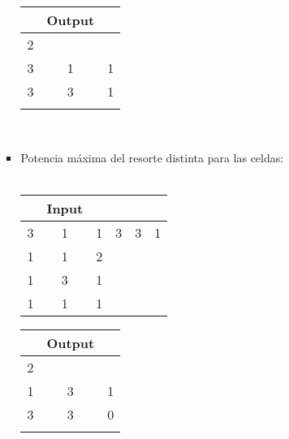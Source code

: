 \documentclass[11pt, a4paper, twoside]{article}
\begin{document}
\begin{itemize}
\begin{itemize}
\begin{itemize}
\begin{minipage}{0.3\textwidth}
\begin{tabular}{ccc}
								   & Output \\
								   \hline
								   2 &   &   \\
								   3 & 1 & 1 \\
								   3 & 3 & 1 \\
								   \\
							\end{tabular}
					    \end{minipage} 	\\
				\item Potencia m\'axima del resorte distinta para las celdas: \\
				\\
					\begin{minipage}{0.4\textwidth}
								\begin{tabular}{cccccc}
								 & Input \\
								   \hline
								   3 & 1 & 1 & 3 & 3 & 1\\
								   1 & 1 & 2 &   &   &  \\
								   1 & 3 & 1 &   &   &  \\
								   1 & 1 & 1 &   &   &  \\
								\end{tabular}
							\end{minipage} 
								\begin{minipage}{0.3\textwidth}
									\begin{tabular}{ccc}
									  & Output \\
									   \hline
									   2 &   &   \\
									   1 & 3 & 1 \\
									   3 & 3 & 0 \\
									   \\
								\end{tabular}
					\end{minipage} \\
					\\
					

\end{itemize}
\end{itemize}
\end{itemize}
\end{document}
